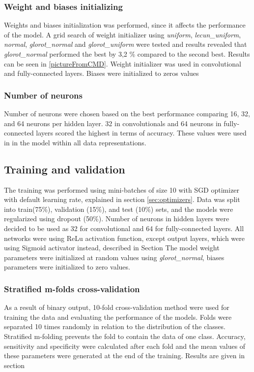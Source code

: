 \subsubsection{Weight and biases initializing}
Weights and biases initialization was performed, since it affects the performance of the model.
A grid search of weight initializer using \textit{uniform}, \textit{lecun\_uniform}, \textit{normal}, \textit{glorot\_normal} and \textit{glorot\_uniform} were tested and results revealed that \textit{glorot\_normal} performed the best by 3,2 \% compared to the second best. Results can be seen in \ref{pictureFromCMD}. Weight initializer was used in convolutional and fully-connected layers.
Biases were initialized to zeros values

\subsubsection{Number of neurons}
Number of neurons were chosen based on the best performance comparing 16, 32, and 64 neurons per hidden layer. 32 in convolutionals and 64 neurons in fully-connected layers scored the highest in terms of accuracy. These values were used in in the model within all data representations.

\subsection{Training and validation}
The training was performed using mini-batches of size 10 with SGD optimizer with default learning rate, explained in section \ref{sec:optimizers}. Data was split into train(75\%), validation (15\%), and test (10\%) sets, and the models were regularized using dropout (50\%). Number of neurons in hidden layers were decided to be used as 32 for convolutional and 64 for fully-connected layers. All networks were using ReLu activation function, except output layers, which were using Sigmoid activator instead, described in Section %
The model weight parameters were initialized at random values using \textit{glorot\_normal}, biases parameters were initialized to zero values.

\subsubsection{Stratified m-folds cross-validation}
As a result of binary output, 10-fold cross-validation method were used for training the data and evaluating the performance of the models. Folds were separated 10 times randomly in relation to the distribution of the classes. Stratified m-folding prevents the fold to contain the data of one class. Accuracy, sensitivity and specificity were calculated after each fold and the mean values of these parameters were generated at the end of the training. Results are given in section %

